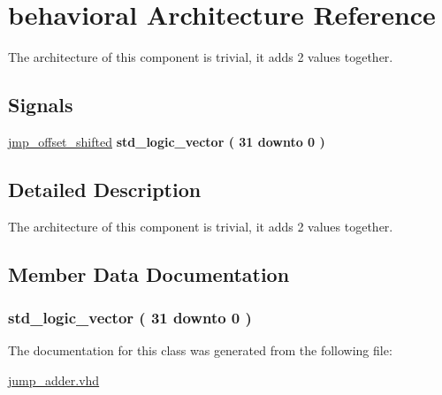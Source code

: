\hypertarget{classjump__adder_1_1behavioral}{\section{behavioral \-Architecture \-Reference}
\label{classjump__adder_1_1behavioral}
}


\-The architecture of this component is trivial, it adds 2 values together.  


\*
\*
\subsection*{\-Signals}
 \begin{DoxyCompactItemize}
\item 
\hyperlink{classjump__adder_1_1behavioral_ae087ef06435fa2f9d0677928ca02358e}{jmp\-\_\-offset\-\_\-shifted} {\bfseries std\-\_\-logic\-\_\-vector (   31    downto    0  ) } 
\end{DoxyCompactItemize}


\subsection{\-Detailed \-Description}
\-The architecture of this component is trivial, it adds 2 values together. 

\subsection{\-Member \-Data \-Documentation}
\hypertarget{classjump__adder_1_1behavioral_ae087ef06435fa2f9d0677928ca02358e}{
\subsubsection[{jmp\-\_\-offset\-\_\-shifted}]{ {\bfseries std\-\_\-logic\-\_\-vector (   31    downto    0  ) } }}\label{classjump__adder_1_1behavioral_ae087ef06435fa2f9d0677928ca02358e}


\-The documentation for this class was generated from the following file\-:\begin{DoxyCompactItemize}
\item 
\hyperlink{jump__adder_8vhd}{jump\-\_\-adder.\-vhd}\end{DoxyCompactItemize}
